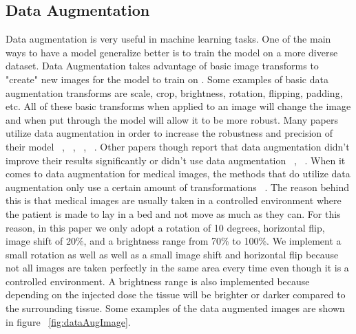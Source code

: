 \subsection{Data Augmentation}
    Data augmentation is very useful in machine learning tasks. 
    One of the main ways to have a model generalize better is to train the model on a more diverse dataset. 
    Data Augmentation takes advantage of basic image transforms to "create" new images for the model to train on \cite{articledataAug}. 
    Some examples of basic data augmentation transforms are scale, crop, brightness, rotation, flipping, padding, etc. 
    All of these basic transforms when applied to an image will change the image and when put through the model will allow it to be more robust. 
    Many papers utilize data augmentation in order to increase the robustness and precision of their model ~\cite{NIPS2012_Krizhevsky}, ~\cite{articledataAug}, ~\cite{DBLP:journals/corr/MilletariNA16}, ~\cite{DBLP:journals/corr/RonnebergerFB15}.
    Other papers though report that data augmentation didn't improve their results significantly or didn't use data augmentation ~\cite{DBLP:journals/corr/HavaeiDWBCBPJL15}, ~\cite{DBLP:journals/corr/abs-1805-10720}. 
    When it comes to data augmentation for medical images, the methods that do utilize data augmentation only use a certain amount of transformations ~\cite{10.1007/978-3-030-01449-0_16dilatedunet}. 
    The reason behind this is that medical images are usually taken in a controlled environment where the patient is made to lay in a bed and not move as much as they can. 
    For this reason, in this paper we only adopt a rotation of 10 degrees, horizontal flip, image shift of 20\%, and a brightness range from 70\% to 100\%.
    We implement a small rotation as well as well as a small image shift and horizontal flip because not all images are taken perfectly in the same area every time even though it is a controlled environment. 
    A brightness range is also implemented because depending on the injected dose the tissue will be brighter or darker compared to the surrounding tissue. 
    Some examples of the data augmented images are shown in figure ~\ref{fig:dataAugImage}. 
    

